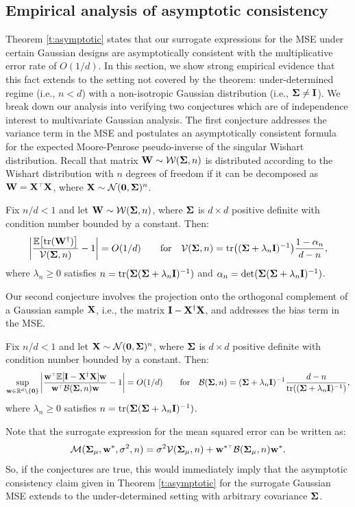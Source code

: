 \subsection{Empirical analysis of asymptotic consistency}
\label{s:empirical}

Theorem \ref{t:asymptotic} states that our surrogate expressions for the MSE under certain Gaussian designs are asymptotically consistent with the multiplicative error rate of $O(1/d)$. 
In this section, we show strong empirical evidence that this fact extends to
the setting not covered by the theorem: under-determined regime (i.e.,
$n<d$) with a non-isotropic Gaussian distribution (i.e., $\mathbf{\Sigma}\neq
\mathbf I$). We break down our analysis into verifying two
conjectures which are of independence interest to multivariate
Gaussian analysis. The first conjecture addresses the variance term in
the MSE and postulates an asymptotically
consistent formula for the expected Moore-Penrose pseudo-inverse
of the singular Wishart distribution. Recall that matrix
$\mathbf W\sim\mathcal{W}(\mathbf{\Sigma},n)$ is distributed according to the Wishart
distribution with $n$ degrees of freedom if it can be decomposed as
$\W=\X^\top\X$, where $\mathbf X\sim\mathcal{N}(\mathbf 0,\mathbf{\Sigma})^n$.
\begin{conjecture}\label{c:wishart}
  Fix $n/d<1$ and let $\mathbf W\sim\mathcal{W}(\mathbf{\Sigma},n )$, where
$\mathbf{\Sigma}$ is $d\times d$ positive definite with condition number bounded by a constant.
  Then:
\begin{align}
\bigg|\frac{\mathbb E\big[\mathrm{tr}(\mathbf W^\dagger)\big]}{\mathcal{V}(\mathbf{\Sigma},n)} -1\bigg|=
  O(1/d)\qquad\text{for}\quad\mathcal{V}(\mathbf{\Sigma},n)=\mathrm{tr}\big((\mathbf{\Sigma}+\lambda_n\mathbf I)^{-1}\big)\frac{1-\alpha_n}{d-n},\label{eq:wishart}
\end{align}
where $\lambda_n\geq 0$ satisfies $n=\mathrm{tr}(\mathbf{\Sigma}(\mathbf{\Sigma}+\lambda_n\mathbf I)^{-1})$ and
$\alpha_n=\det(\mathbf{\Sigma}(\mathbf{\Sigma}+\lambda_n\mathbf I)^{-1})$.
\end{conjecture}
Our second conjecture involves the projection onto the
orthogonal complement of a Gaussian sample $\mathbf X$, i.e., the matrix
$\mathbf I-\mathbf X^\dagger\mathbf X$, and addresses the bias term in the MSE.
\begin{conjecture}\label{c:projection}
  Fix $n/d<1$ and let $\mathbf X\sim \mathcal{N}(\mathbf 0,\mathbf{\Sigma})^n$, where
$\mathbf{\Sigma}$ is $d\times d$ positive definite with condition number bounded by a constant. Then:
\begin{align}
\sup_{\w\in\R^d\backslash\{\zero\}}\bigg|\frac{\w^\top\E[\I-\X^\dagger\X]\w}{\w^\top
  \Bc(\Sigmab,n)\w} - 1\bigg| = O(1/d)\qquad\text{for}\quad
  \Bc(\Sigmab,n) =
  (\Sigmab+\lambda_n\I)^{-1}\frac{d-n}{\tr((\Sigmab+\lambda_n\I)^{-1})},\label{eq:projection}  
\end{align}
where $\lambda_n\geq 0$ satisfies $n=\mathrm{tr}(\mathbf{\Sigma}(\mathbf{\Sigma}+\lambda_n\mathbf I)^{-1})$.
\end{conjecture}
Note that the surrogate expression for the mean squared
error can be written as:
\[
\Mc(\Sigmab_\mu,\w^*,\sigma^2,n)=\sigma^2 \Vc(\Sigmab_\mu,n)
+ \w^{*\top}\Bc(\Sigmab_\mu,n)\w^*.
\]
So, if the conjectures are true,
this would immediately imply that the asymptotic consistency claim
given in Theorem \ref{t:asymptotic} for
the surrogate Gaussian MSE extends to
the under-determined setting with arbitrary covariance $\mathbf{\Sigma}$.

